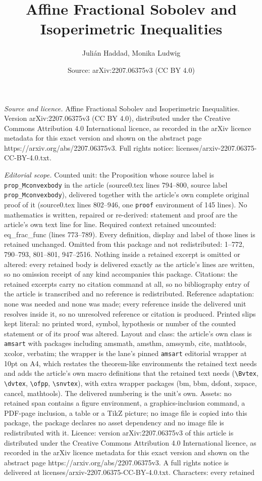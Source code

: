 \documentclass[10pt,a4paper]{amsart}
\title[Affine Fractional Sobolev and Isoperimetric Inequalities]{Affine Fractional Sobolev and Isoperimetric Inequalities}
\author{Juli\'an Haddad, Monika Ludwig}
\date{Source: arXiv:2207.06375v3 (CC BY 4.0)}
\begin{document}
\maketitle

\noindent\emph{Source and licence.} Affine Fractional Sobolev and Isoperimetric Inequalities. Version arXiv:2207.06375v3 (CC BY 4.0), distributed under the Creative Commons Attribution 4.0 International licence, as recorded in the arXiv licence metadata for this exact version and shown on the abstract page https://arxiv.org/abs/2207.06375v3. Full rights notice: licenses/arxiv-2207.06375-CC-BY-4.0.txt.\par\smallskip

\noindent\textit{Editorial scope.} Counted unit: the Proposition whose source label is \texttt{prop\_Mconvexbody} in the article (source0.tex lines 794--800, source label \texttt{prop\_Mconvexbody}), delivered together with the article's own complete original proof of it (source0.tex lines 802--946, one \texttt{proof} environment of 145 lines). No mathematics is written, repaired or re-derived: statement and proof are the article's own text line for line. Required context retained uncounted: eq\_frac\_func (lines 773--789). Every definition, display and label of those lines is retained unchanged. Omitted from this package and not redistributed: 1--772, 790--793, 801--801, 947--2516. Nothing inside a retained excerpt is omitted or altered: every retained body is delivered exactly as the article's lines are written, so no omission receipt of any kind accompanies this package. Citations: the retained excerpts carry no citation command at all, so no bibliography entry of the article is transcribed and no reference is redistributed. Reference adaptation: none was needed and none was made; every reference inside the delivered unit resolves inside it, so no unresolved reference or citation is produced. Printed slips kept literal: no printed word, symbol, hypothesis or number of the counted statement or of its proof was altered. Layout and class: the article's own class is \texttt{amsart} with packages including amsmath, amsthm, amssymb, cite, mathtools, xcolor, verbatim; the wrapper is the lane's pinned \texttt{amsart} editorial wrapper at 10pt on A4, which restates the theorem-like environments the retained text needs and adds the article's own macro definitions that the retained text needs (\texttt{\textbackslash Bvtex}, \texttt{\textbackslash dvtex}, \texttt{\textbackslash ofpp}, \texttt{\textbackslash snvtex}), with extra wrapper packages (bm, bbm, dsfont, xspace, cancel, mathtools). The delivered numbering is the unit's own. Assets: no retained span contains a figure environment, a graphics-inclusion command, a PDF-page inclusion, a table or a TikZ picture; no image file is copied into this package, the package declares no asset dependency and no image file is redistributed with it. Licence: version arXiv:2207.06375v3 of this article is distributed under the Creative Commons Attribution 4.0 International licence, as recorded in the arXiv licence metadata for this exact version and shown on the abstract page https://arxiv.org/abs/2207.06375v3. A full rights notice is delivered at licenses/arxiv-2207.06375-CC-BY-4.0.txt. Characters: every retained 
\end{document}
